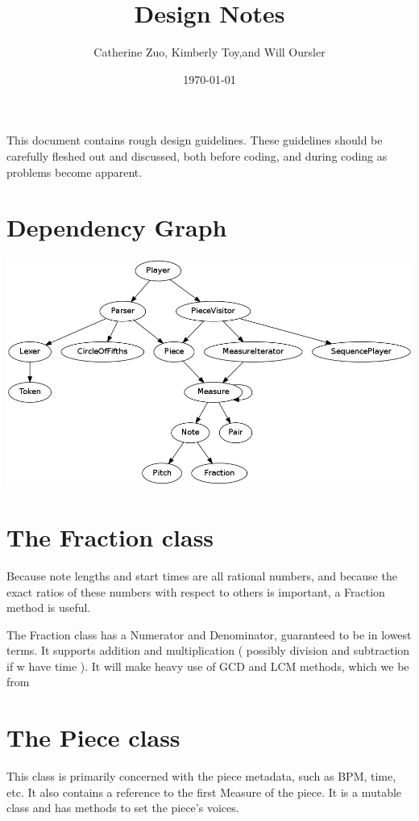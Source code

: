 \documentclass{amsart}
\begin{document}
\author{ Catherine Zuo, Kimberly Toy,and Will Oursler}
\title{Design Notes}
\date{\today}
\maketitle

This document contains rough design guidelines. These guidelines should be carefully fleshed out and discussed, both before coding, and during coding as problems become apparent.

\section{ Dependency Graph }

\includegraphics[width=\linewidth]{classes.png}

\section{ The Fraction class }

Because note lengths and start times are all rational numbers, and because the exact ratios of these numbers with respect to others is important, a Fraction method is useful.

The Fraction class has a Numerator and Denominator, guaranteed to be in lowest terms. It supports addition and multiplication ( possibly division and subtraction if w have time ). It will make heavy use of GCD and LCM methods, which we be from %

\section{ The Piece class }

This class is primarily concerned with the piece metadata, such as BPM, time, etc. It also contains a reference to the first Measure of the piece.  It is a mutable class and has methods to set the piece's voices.  
\end{document}
